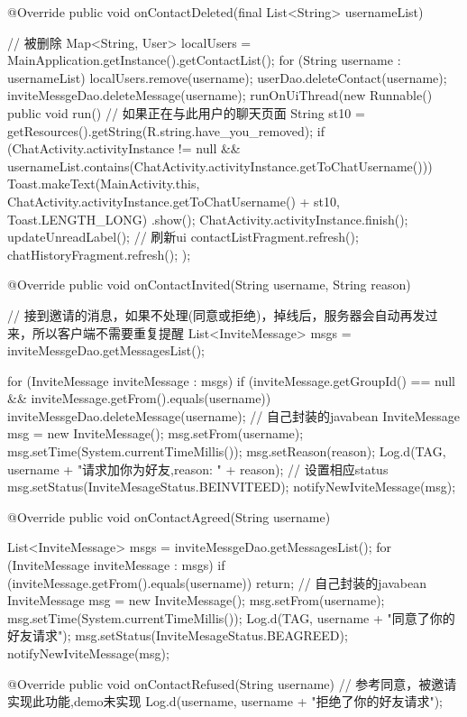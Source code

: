 {{{		}

		@Override
		public void onContactDeleted(final List<String> usernameList) {
			// 被删除
			Map<String, User> localUsers = MainApplication.getInstance().getContactList();
			for (String username : usernameList) {
				localUsers.remove(username);
				userDao.deleteContact(username);
				inviteMessgeDao.deleteMessage(username);
			}
			runOnUiThread(new Runnable() {
				public void run() {
					// 如果正在与此用户的聊天页面
					String st10 = getResources().getString(R.string.have_you_removed);
					if (ChatActivity.activityInstance != null
							&& usernameList.contains(ChatActivity.activityInstance.getToChatUsername())) {
						Toast.makeText(MainActivity.this, ChatActivity.activityInstance.getToChatUsername() + st10, Toast.LENGTH_LONG)
								.show();
						ChatActivity.activityInstance.finish();
					}
					updateUnreadLabel();
					// 刷新ui
					contactListFragment.refresh();
					chatHistoryFragment.refresh();
				}
			});

		}

		@Override
		public void onContactInvited(String username, String reason) {
			// 接到邀请的消息，如果不处理(同意或拒绝)，掉线后，服务器会自动再发过来，所以客户端不需要重复提醒
			List<InviteMessage> msgs = inviteMessgeDao.getMessagesList();

			for (InviteMessage inviteMessage : msgs) {
				if (inviteMessage.getGroupId() == null && inviteMessage.getFrom().equals(username)) {
					inviteMessgeDao.deleteMessage(username);
				}
			}
			// 自己封装的javabean
			InviteMessage msg = new InviteMessage();
			msg.setFrom(username);
			msg.setTime(System.currentTimeMillis());
			msg.setReason(reason);
			Log.d(TAG, username + "请求加你为好友,reason: " + reason);
			// 设置相应status
			msg.setStatus(InviteMesageStatus.BEINVITEED);
			notifyNewIviteMessage(msg);

		}

		@Override
		public void onContactAgreed(String username) {
			List<InviteMessage> msgs = inviteMessgeDao.getMessagesList();
			for (InviteMessage inviteMessage : msgs) {
				if (inviteMessage.getFrom().equals(username)) {
					return;
				}
			}
			// 自己封装的javabean
			InviteMessage msg = new InviteMessage();
			msg.setFrom(username);
			msg.setTime(System.currentTimeMillis());
			Log.d(TAG, username + "同意了你的好友请求");
			msg.setStatus(InviteMesageStatus.BEAGREED);
			notifyNewIviteMessage(msg);

		}

		@Override
		public void onContactRefused(String username) {
			// 参考同意，被邀请实现此功能,demo未实现
			Log.d(username, username + "拒绝了你的好友请求");
		}

}}
